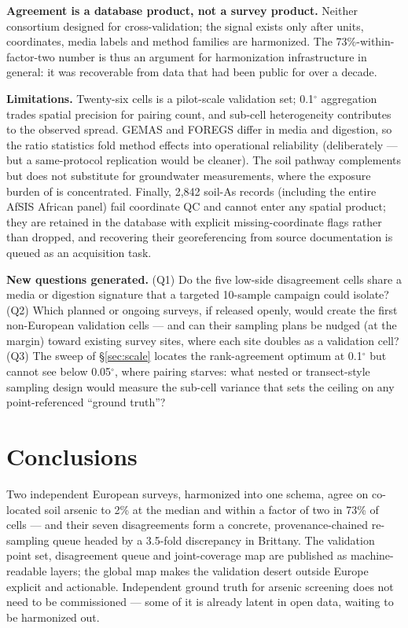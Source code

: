 \documentclass[11pt]{article}
\begin{document}
\textbf{Agreement is a database product, not a survey product.} Neither
consortium designed for cross-validation; the signal exists only after
units, coordinates, media labels and method families are harmonized. The
73\%-within-factor-two number is thus an argument for harmonization
infrastructure in general: it was recoverable from data that had been
public for over a decade.

\textbf{Limitations.} Twenty-six cells is a pilot-scale validation set;
0.1$^{\circ}$ aggregation trades spatial precision for pairing count, and
sub-cell heterogeneity contributes to the observed spread. GEMAS and FOREGS
differ in media and digestion, so the ratio statistics fold method effects
into operational reliability (deliberately --- but a same-protocol
replication would be cleaner). The soil pathway complements but does not
substitute for groundwater measurements, where the exposure burden of
\cite{podgorski2020} is concentrated. Finally, 2,842 soil-As records
(including the entire AfSIS African panel) fail coordinate QC and cannot
enter any spatial product; they are retained in the database with explicit
missing-coordinate flags rather than dropped, and recovering their
georeferencing from source documentation is queued as an acquisition task.

\textbf{New questions generated.} (Q1) Do the five low-side disagreement
cells share a media or digestion signature that a targeted 10-sample
campaign could isolate? (Q2) Which planned or ongoing surveys, if released
openly, would create the first non-European validation cells --- and can
their sampling plans be nudged (at the margin) toward existing survey
sites, where each site doubles as a validation cell? (Q3) The sweep of
\S\ref{sec:scale} locates the rank-agreement optimum at 0.1$^{\circ}$ but
cannot see below 0.05$^{\circ}$, where pairing starves: what nested or
transect-style sampling design would measure the sub-cell variance that
sets the ceiling on any point-referenced ``ground truth''?

\section{Conclusions}
Two independent European surveys, harmonized into one schema, agree on
co-located soil arsenic to 2\% at the median and within a factor of two in
73\% of cells --- and their seven disagreements form a concrete,
provenance-chained re-sampling queue headed by a 3.5-fold discrepancy in
Brittany. The validation point set, disagreement queue and joint-coverage
map are published as machine-readable layers; the global map makes the
validation desert outside Europe explicit and actionable. Independent
ground truth for arsenic screening does not need to be commissioned ---
some of it is already latent in open data, waiting to be harmonized out.
\end{document}
